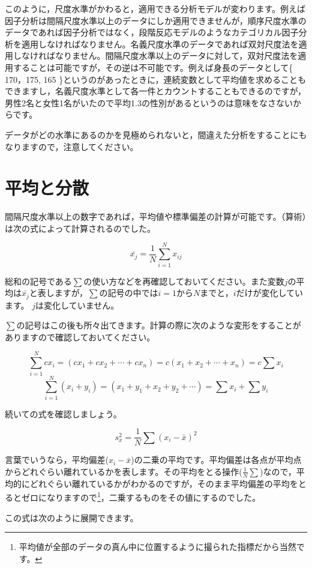 \documentclass{ltjsbook}
\begin{document}
このように，尺度水準がかわると，適用できる分析モデルが変わります。例えば因子分析は間隔尺度水準以上のデータにしか適用できませんが，順序尺度水準のデータであれば因子分析ではなく，段階反応モデルのようなカテゴリカル因子分析を適用しなければなりません。名義尺度水準のデータであれば双対尺度法を適用しなければなりません。間隔尺度水準以上のデータに対して，双対尺度法を適用することは可能ですが，その逆は不可能です。例えば身長のデータとして\{ 170，175, 165 \}というのがあったときに，連続変数として平均値を求めることもできますし，名義尺度水準として各一件とカウントすることもできるのですが，男性2名と女性1名がいたので平均1.3の性別があるというのは意味をなさないからです。

データがどの水準にあるのかを見極められないと，間違えた分析をすることにもなりますので，注意してください。

\section{平均と分散}
\label{moment}
間隔尺度水準以上の数字であれば，平均値や標準偏差の計算が可能です。（算術）は次の式によって計算されるのでした。

\[  \bar{x_j} = \frac{1}{N} \sum_{i=1}^N x_{ij} \]

総和の記号である$\sum$の使い方などを再確認しておいてください。また変数$j$の平均は$\bar{x_j}$と表しますが，$\sum$の記号の中では$i=1$から$N$までと，$i$だけが変化しています。 $j$は変化していません。

$\sum$の記号はこの後も所々出てきます。計算の際に次のような変形をすることがありますので確認しておいてください。

\[ \sum_{i=1}^N cx_i = (cx_1 + cx_2 + \cdots + cx_n) = c(x_1 + x_2 + \cdots + x_n) =  c\sum x_i \]
\[ \sum_{i=1}^N (x_i + y_i) = (x_1 + y_1 + x_2 + y_2 + \cdots) = \sum x_i + \sum y_i \]

続いての式を確認しましょう。

\[ s_x^2 = \frac{1}{N}\sum(x_i - \bar{x})^2 \]

言葉でいうなら，平均偏差($x_i - \bar{x}$)の二乗の平均です。平均偏差は各点が平均点からどれぐらい離れているかを表します。その平均をとる操作($\frac{1}{N}\sum$)なので，平均的にどれぐらい離れているかがわかるのですが，そのまま平均偏差の平均をとるとゼロになりますので\footnote{平均値が全部のデータの真ん中に位置するように撮られた指標だから当然です。}，二乗するものをその値にするのでした。

この式は次のように展開できます。
\end{document}
